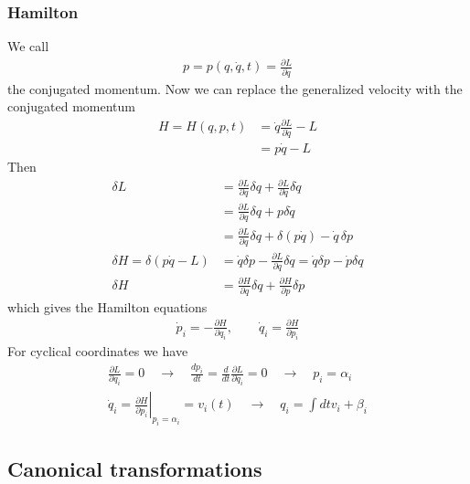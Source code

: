 \documentclass{article}
\begin{document}
\subsubsection{Hamilton}
We call
\begin{align}
    p=p(q,\dot q,t)=\frac{\partial L}{\partial \dot q}
\end{align}
the conjugated momentum. Now we can replace the generalized velocity with the conjugated momentum
\begin{align}
    H=H(q,p,t)
    &=\dot q\frac{\partial L}{\partial\dot q}-L\\
    &=p\dot q-L
\end{align}
Then
\begin{align}
    \delta L
    &=\frac{\partial L}{\partial q}\delta q+\frac{\partial L}{\partial \dot q}\delta\dot q\\
    &=\frac{\partial L}{\partial q}\delta q+p\delta\dot q\\
    &=\frac{\partial L}{\partial q}\delta q+\delta(p\dot q)-\dot q\,\delta p\\
    \delta H=\delta(p\dot q-L)&=\dot q\delta p-\frac{\partial L}{\partial q}\delta q=\dot q\delta p-\dot p\delta q\\
    \delta H&=\frac{\partial H}{\partial q}\delta q+\frac{\partial H}{\partial p}\delta p
\end{align}
which gives the Hamilton equations
\begin{align}
    \dot p_i=-\frac{\partial H}{\partial q_i},\quad\quad
    \dot q_i=\frac{\partial H}{\partial p_i}
\end{align}
For cyclical coordinates we have
\begin{align}
    \frac{\partial L}{\partial q_i}=0\quad\rightarrow\quad\frac{dp_i}{dt}=\frac{d}{dt}\frac{\partial L}{\partial\dot q_i}=0\quad\rightarrow\quad p_i=\alpha_i\\
    \dot q_i=\left.\frac{\partial H}{\partial p_i}\right|_{p_i=\alpha_i}=v_i(t)\quad\rightarrow\quad q_i=\int dt v_i+\beta_i
\end{align}



\subsection{Canonical transformations}
\end{document}
